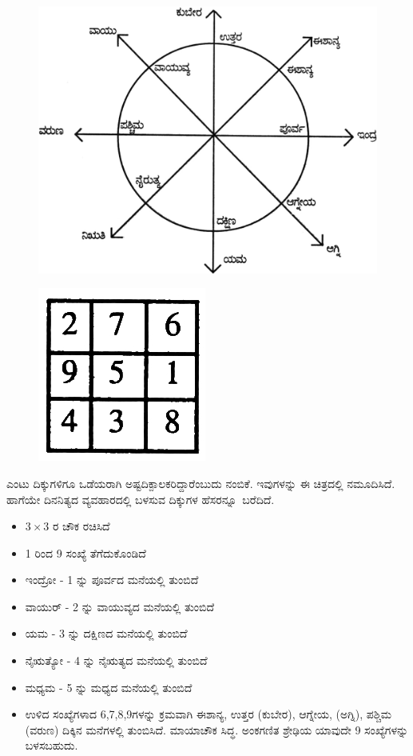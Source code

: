 \begin{figure}[H]
\includegraphics[scale=.85]{src/figures/chap3/fig3-38.jpg}
\end{figure}
\begin{figure}[H]
\includegraphics{src/figures/chap3/fig3-39.jpg}
\end{figure}

ಎಂಟು ದಿಕ್ಕುಗಳಿಗೂ ಒಡೆಯರಾಗಿ ಅಷ್ಟದಿಕ್ಪಾಲಕರಿದ್ದಾರೆಂಬುದು ನಂಬಿಕೆ. ಇವುಗಳನ್ನು ಈ ಚಿತ್ರದಲ್ಲಿ ನಮೂದಿಸಿದೆ. ಹಾಗೆಯೇ ದಿನನಿತ್ಯದ ವ್ಯವಹಾರದಲ್ಲಿ ಬಳಸುವ ದಿಕ್ಕುಗಳ \hbox{ಹೆಸರನ್ನೂ ಬರೆದಿದೆ.}

\begin{itemize}
	\item $3 \times 3$ ರ ಚೌಕ ರಚಿಸಿದೆ
	\item 1 ರಿಂದ 9 ಸಂಖ್ಯೆ ತೆಗೆದುಕೊಂಡಿದೆ
	\item ಇಂದ್ರೋ - 1 ನ್ನು ಪೂರ್ವದ ಮನೆಯಲ್ಲಿ ತುಂಬಿದೆ
	\item ವಾಯುರ್ - 2 ನ್ನು ವಾಯುವ್ಯದ ಮನೆಯಲ್ಲಿ ತುಂಬಿದೆ
	\item ಯಮ - 3 ನ್ನು ದಕ್ಷಿಣದ ಮನೆಯಲ್ಲಿ ತುಂಬಿದೆ
	\item ನೈಋತ್ಯೋ - 4 ನ್ನು ನೈಋತ್ಯದ ಮನೆಯಲ್ಲಿ ತುಂಬಿದೆ
	\item ಮಧ್ಯಮ - 5 ನ್ನು ಮಧ್ಯದ ಮನೆಯಲ್ಲಿ ತುಂಬಿದೆ
	\item ಉಳಿದ ಸಂಖ್ಯೆಗಳಾದ 6,7,8,9ಗಳನ್ನು ಕ್ರಮವಾಗಿ ಈಶಾನ್ಯ, ಉತ್ತರ (ಕುಬೇರ), ಆಗ್ನೇಯ, (ಅಗ್ನಿ), ಪಶ್ಚಿಮ (ವರುಣ) ದಿಕ್ಕಿನ ಮನೆಗಳಲ್ಲಿ ತುಂಬಿಸಿದೆ. ಮಾಯಾಚೌಕ ಸಿದ್ಧ. ಅಂಕಗಣಿತ ಶ್ರೇಢಿಯ ಯಾವುದೇ 9 ಸಂಖ್ಯೆಗಳನ್ನು ಬಳಸಬಹುದು.
\end{itemize}

